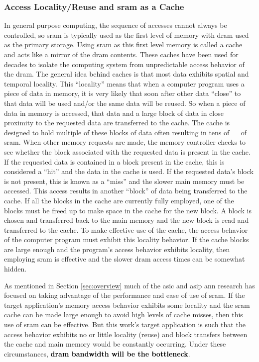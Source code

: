 \subsubsection{Access Locality/Reuse and \ac{sram} as a Cache}
\label{Access Locality/Reuse and Cache}

In general purpose computing, the sequence of accesses cannot always be controlled, so \ac{sram} is typically used as the first level of memory with \ac{dram} used as the primary storage. 
Using \ac{sram} as this first level memory is called a cache and acts like a mirror of the \ac{dram} contents.
These caches have been used for decades to isolate the computing system from unpredictable access behavior of the \ac{dram}.
The general idea behind caches is that most data exhibits spatial and temporal locality. This ``locality'' means that when a computer program uses a piece of data in memory, it is very likely that soon after other data ``close'' to that data will be used and/or the same data will be reused.
So when a piece of data in memory is accessed, that data and a large block of data in close proximity to the requested data are transferred to the cache. 
The cache is designed to hold multiple of these blocks of data often resulting in tens of \SI[per-mode=symbol]{}{\kilo \byte} of \ac{sram}.
When other memory requests are made, the memory controller checks to see whether the block associated with the requested data is present in the cache.
If the requested data is contained in a block present in the cache, this is considered a ``hit'' and the data in the cache is used. 
If the requested data's block is not present, this is known as a ``miss'' and the slower main memory must be accessed. This access results in another ``block'' of data being transferred to the cache.
If all the blocks in the cache are currently fully employed, one of the blocks must be freed up to make space in the cache for the new block. 
A block is chosen and transferred back to the main memory and the new block is read and transferred to the cache.
To make effective use of the cache, the access behavior of the computer program must exhibit this locality behavior. 
If the cache blocks are large enough and the program's access behavior exhibits locality, then employing \ac{sram} is effective and the slower \ac{dram} access times can be somewhat hidden.

As mentioned in Section \ref{sec:overview} much of the \ac{asic} and \ac{asip} \ac{ann} research has focused on taking advantage of the performance and ease of use of \ac{sram}. 
If the target application's memory access behavior exhibits some locality and the \ac{sram} cache can be made large enough to avoid high levels of cache misses, then this use of \ac{sram} can be effective.
But this work's target application is such that the access behavior exhibits no or little locality (reuse) and block transfers between the cache and main memory would be constantly occurring.
Under these circumstances, \textbf{\textcolor{black}{\ac{dram} bandwidth will be the bottleneck}}.

